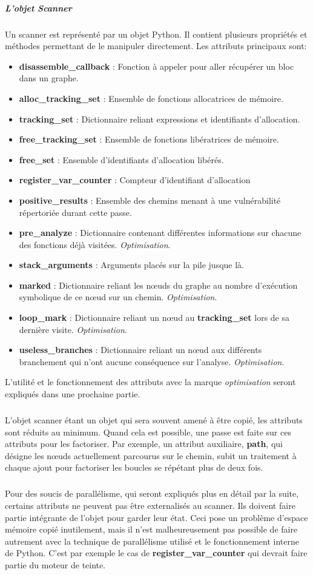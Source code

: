 \subparagraph{L'objet Scanner}
Un scanner est représenté par un objet Python. Il contient plusieurs propriétés et méthodes permettant de le manipuler directement.
Les attributs principaux sont:
\begin{itemize}
    \item \textbf{disassemble\_callback} : Fonction à appeler pour aller récupérer un bloc dans un graphe.
    \item \textbf{alloc\_tracking\_set} : Ensemble de fonctions allocatrices de mémoire.
    \item \textbf{tracking\_set} : Dictionnaire reliant expressions et identifiants d'allocation.
    \item \textbf{free\_tracking\_set} : Ensemble de fonctions libératrices de mémoire.
    \item \textbf{free\_set} : Ensemble d'identifiants d'allocation libérés.
    \item \textbf{register\_var\_counter} : Compteur d'identifiant d'allocation
    \item \textbf{positive\_results} : Ensemble des chemins menant à une vulnérabilité répertoriée durant cette passe.
    \item \textbf{pre\_analyze} : Dictionnaire contenant différentes informations sur chacune des fonctions déjà visitées. \textit{Optimisation}.
    \item \textbf{stack\_arguments} : Arguments placés sur la pile jusque là.
    \item \textbf{marked} : Dictionnaire reliant les nœuds du graphe au nombre d'exécution symbolique de ce nœud sur un chemin. \textit{Optimisation}.
    \item \textbf{loop\_mark} : Dictionnaire reliant un nœud au \textbf{tracking\_set} lors de sa dernière visite. \textit{Optimisation}.
    \item \textbf{useless\_branches} : Dictionnaire reliant un nœud aux différents branchement qui n'ont aucune conséquence sur l'analyse. \textit{Optimisation}.
\end{itemize}
L'utilité et le fonctionnement des attributs avec la marque \textit{optimisation} seront expliqués dans une prochaine partie.
\subparagraph{}
L'objet scanner étant un objet qui sera souvent amené à être copié, les attributs sont réduits au minimum. Quand cela est possible, une passe est faite sur
ces attributs pour les factoriser. Par exemple, un attribut auxiliaire, \textbf{path}, qui désigne les nœuds actuellement parcourus sur le chemin, subit un traitement
à chaque ajout pour factoriser les boucles se répétant plus de deux fois.
\subparagraph{}
Pour des soucis de parallélisme, qui seront expliqués plus en détail par la suite, certains attributs ne peuvent pas être externalisés au scanner. Ils doivent faire partie
intégrante de l'objet pour garder leur état. Ceci pose un problème d'espace mémoire copié inutilement, mais il n'est malheureusement pas possible de faire autrement avec
la technique de parallélisme utilisé et le fonctionnement interne de Python. C'est par exemple le cas de \textbf{register\_var\_counter} qui devrait faire partie du moteur de teinte.

